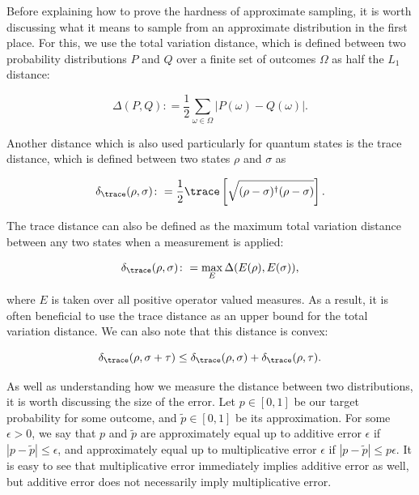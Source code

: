 Before explaining how to prove the hardness of approximate sampling, it is worth discussing what it means to sample from an approximate distribution in the first place. For this, we use the total variation distance, which is defined between two probability distributions $P$ and $Q$ over a finite set of outcomes $\Omega$ as half the $L_1$ distance:

\begin{equation}
\Delta(P, Q) \colon= \frac{1}{2}\sum_{\omega \in \Omega}|P(\omega) - Q(\omega)|.
\end{equation}

Another distance which is also used particularly for quantum states is the trace distance, which is defined between two states $\rho$ and $\sigma$ as

\begin{equation}
\delta_{\trace}(\rho, \sigma) \colon= \frac{1}{2}\trace\left[\sqrt{(\rho-\sigma)^\dagger(\rho-\sigma)}\right].
\end{equation}

The trace distance can also be defined as the maximum total variation distance between any two states when a measurement is applied:

\begin{equation}
\delta_{\trace}(\rho, \sigma) \colon= \max_E\Delta(E(\rho), E(\sigma)),
\end{equation}

\noindent where $E$ is taken over all positive operator valued measures. As a result, it is often beneficial to use the trace distance as an upper bound for the total variation distance. We can also note that this distance is convex:

\begin{equation}
\delta_{\trace}(\rho, \sigma + \tau) \leq \delta_{\trace}(\rho, \sigma) + \delta_{\trace}(\rho, \tau).
\end{equation}

As well as understanding how we measure the distance between two distributions, it is worth discussing the size of the error. Let $p \in [0,1]$ be our target probability for some outcome, and $\tilde{p} \in [0,1]$ be its approximation. For some $\epsilon > 0$, we say that $p$ and $\tilde{p}$ are approximately equal up to additive error $\epsilon$ if $|p-\tilde{p}|\leq \epsilon$, and approximately equal up to multiplicative error $\epsilon$ if $|p-\tilde{p}|\leq p\epsilon$. It is easy to see that multiplicative error immediately implies additive error as well, but additive error does not necessarily imply multiplicative error.

